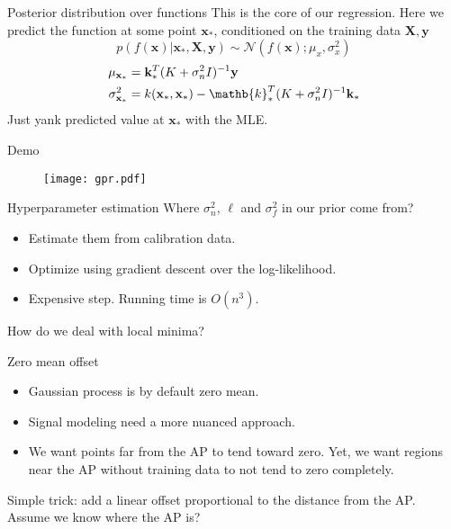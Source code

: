 \documentclass{beamer}
\begin{document}
\begin{frame}{Posterior distribution over functions}
  This is the core of our regression. Here we predict the function at some
  point $\mathbf{x}_*$, conditioned on the training data $\mathbf{X},\mathbf{y}$
  \[
  p(f(\mathbf{x})|\mathbf{x}_{*},\mathbf{X},\mathbf{y}) 
  \sim \mathcal{N}(f(\mathbf{x}); \mu_x, \sigma_{x}^2) 
  \]
  \begin{align*}
  \mu_\mathbf{x_*} &= \mathbf{k}_{*}^{T} (K  + \sigma_n^2I)^{-1} \mathbf{y} \\
  \sigma^2_{\mathbf{x}_*} &= k(\mathbf{x}_{*}, \mathbf{x}_{*}) - 
  \mathb{k}_{*}^{T}(K + \sigma^2_nI)^{-1}\mathbf{k}_{*}
  \end{align*}
  Just yank predicted value at $\mathbf{x_*}$ with the MLE.
\end{frame}

\begin{frame}{Demo}
  \begin{figure}
    \centering
    \texttt{[image: gpr.pdf]}
  \end{figure}
\end{frame}

\begin{frame}{Hyperparameter estimation}
  Where $\sigma^2_n$, $\ell$ and $\sigma^2_f$ in our prior come from?
  \begin{itemize}
  \item Estimate them from calibration data.
  \item Optimize using gradient descent over the log-likelihood.
  \item Expensive step. Running time is $O(n^3)$.
  \end{itemize}
  How do we deal with local minima?
\end{frame}

\begin{frame}{Zero mean offset}
  \begin{itemize}
  \item Gaussian process is by default zero mean.
  \item Signal modeling need a more nuanced approach.
    \pause
  \item We want points far from the AP to tend toward zero. Yet, we want
    regions near the AP without training data to not tend to zero completely.
  \end{itemize}
  \pause
  Simple trick: add a linear offset proportional to the distance from the
  AP. Assume we know where the AP is?
\end{frame}
\end{document}
